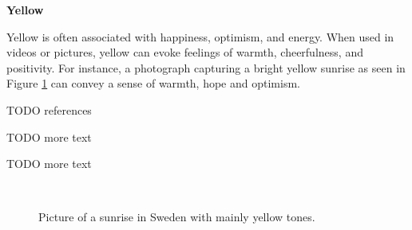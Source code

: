 \documentclass[../MasterThesis.tex]{subfiles}
\begin{document}
\begin{minipage}{0.45\textwidth}
	
	
	
	
\end{minipage}


\newpage
\textbf{\textcolor{YellowOrange}{Yellow}}

%
%
\begin{minipage}{0.45\textwidth}
	Yellow is often associated with happiness, optimism, and energy. When used in videos or pictures, yellow can evoke feelings of warmth, cheerfulness, and positivity. For instance, a photograph capturing a bright yellow sunrise as seen in Figure \ref{figure:yellow} can convey a sense of warmth, hope and optimism.
	
	TODO references
	
	TODO more text
	
	TODO more text
	
\end{minipage}\begin{minipage}{0.05\textwidth}
	\ 
\end{minipage}\begin{minipage}{0.5\textwidth}
	\begin{figure}[H]
		\begin{center}
			\label{figure:yellow}
			\caption[Picture of a sunrise in Sweden with mainly yellow tones.]{Picture of a sunrise in Sweden with mainly yellow tones.}
		\end{center}
	\end{figure}\hfill
\end{minipage}
\end{document}
